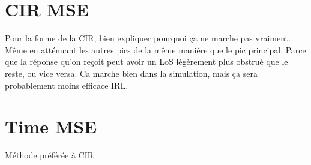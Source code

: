 \section{CIR MSE}

Pour la forme de la CIR, bien expliquer pourquoi ça ne marche pas vraiment. Même en atténuant les autres pics de la même manière que le pic principal. Parce que la réponse qu'on reçoit peut avoir un LoS légèrement plus obstrué que le reste, ou vice versa. Ca marche bien dans la simulation, mais ça sera probablement moins efficace IRL.

\section{Time MSE}

Méthode préférée à CIR
